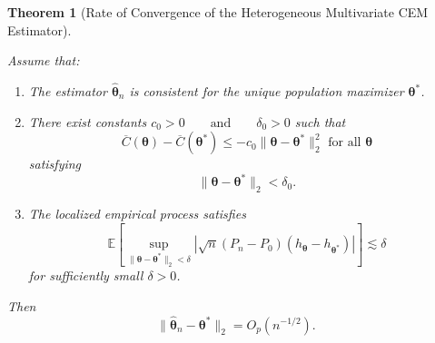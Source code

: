 \documentclass[pdflatex,sn-mathphys-ay]{sn-jnl}%
\let\oldtheta\theta
\renewcommand{\theta}{\boldsymbol{\oldtheta}}
\theoremstyle{thmstyleone}%
\newtheorem{theorem}{Theorem}%
\theoremstyle{thmstyletwo}%
\theoremstyle{thmstylethree}%
\begin{document}
\begin{theorem}[Rate of Convergence of the Heterogeneous Multivariate CEM Estimator]
\label{thm:rate_of_convergence}

Assume that:

\begin{enumerate}

\item
The estimator $\widehat{\boldsymbol{\theta}}_n$ is consistent for the unique population maximizer $\boldsymbol{\theta}^*$.
\item There exist constants
   $ c_0>0
    \qquad
    \text{and}
    \qquad
    \delta_0>0$
such that
\[
    \overline{C}(\boldsymbol{\theta})
    -
    \overline{C}(\boldsymbol{\theta}^*)
    \leq
    -c_0
    \|
        \boldsymbol{\theta}
        -
        \boldsymbol{\theta}^*
    \|_2^2 \text{ for all }  \boldsymbol{\theta}
\]
satisfying
\[
    \|
        \boldsymbol{\theta}
        -
        \boldsymbol{\theta}^*
    \|_2
    <
    \delta_0.
\]

\item
The localized empirical process satisfies
\[
    \mathbb{E}
    \left[
        \sup_{
            \|
            \boldsymbol{\theta}
            -
            \boldsymbol{\theta}^*
            \|_2
            <
            \delta
        }
        \left|
            \sqrt{n}
            (P_n-P_0)
            \left(
                h_{\boldsymbol{\theta}}
                -
                h_{\boldsymbol{\theta}^*}
            \right)
        \right|
    \right]
    \lesssim
    \delta
\]
for sufficiently small $ \delta>0$.


\end{enumerate}

Then
\[
    \|
        \widehat{\boldsymbol{\theta}}_n
        -
        \boldsymbol{\theta}^*
    \|_2
    =
    O_p(n^{-1/2}).
\]

\end{theorem}
\end{document}
